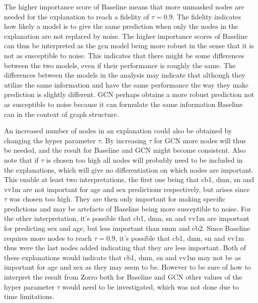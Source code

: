 The higher importance score of Baseline means that more unmasked nodes are needed for the explanation to reach a fidelity of $\tau = 0.9$. The fidelity indicates how likely a model is to give the same prediction when only the nodes in the explanation are not replaced by noise. The higher importance scores of Baseline can thus be interpreted as the \acrshort{gcn} model being more robust in the sense that it is not as susceptible to noise. This indicates that there might be some differences between the two models, even if their performance is roughly the same. The differences between the models in the analysis may indicate that although they utilize the same information and have the same performance the way they make prediction is slightly different. GCN perhaps obtains a more robust prediction not as susceptible to noise because it can formulate the same information Baseline can in the context of graph structure. 

An increased number of nodes in an explanation could also be obtained by changing the hyper parameter $\tau$. By increasing $\tau$ for GCN more nodes will thus be needed, and the result for Baseline and GCN might become consistent. Also note that if $\tau$ is chosen too high all nodes will probably need to be included in the explanations, which will give no differentiation on which nodes are important. This enable at least two interpretations, the first one being that \acrshort{cb1}, \acrshort{dmn}, \acrshort{sn} and \acrshort{vv1m} are not important for age and sex predictions respectively, but arises since $\tau$ was chosen too high. They are then only important for making specific predictions and may be artefacts of Baseline being more susceptible to noise. For the other interpretation, it's possible that \acrshort{cb1}, \acrshort{dmn}, \acrshort{sn} and \acrshort{vv1m} are important for predicting sex and age, but less important than \acrshort{smm} and \acrshort{cb2}. Since Baseline requires more nodes to reach $\tau = 0.9$, it's possible that \acrshort{cb1}, \acrshort{dmn}, \acrshort{sn} and \acrshort{vv1m} thus were the last nodes added indicating that they are less important. Both of these explanations would indicate that \acrshort{cb1}, \acrshort{dmn}, \acrshort{sn} and \acrshort{vv1m} may not be as important for age and sex as they may seem to be. However to be sure of how to interpret the result from Zorro both for Baseline and GCN other values of the hyper parameter $\tau$ would need to be investigated, which was not done due to time limitations. 


